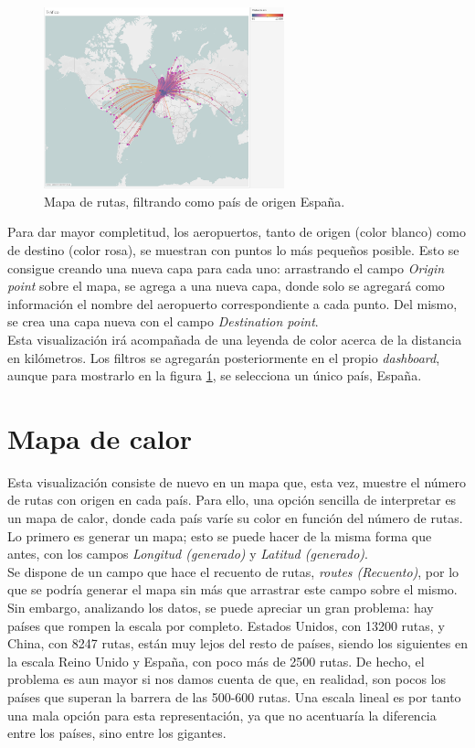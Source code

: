 \documentclass[11pt]{opticajnl}
\begin{document}
\begin{figure}[h]
\centering
\includegraphics[width=0.62\textwidth]{fotos/1.png}
\caption{Mapa de rutas, filtrando como país de origen España.}
\label{fig:1}
\end{figure}

Para dar mayor completitud, los aeropuertos, tanto de origen (color blanco) como de destino (color rosa), se muestran con puntos lo más pequeños posible. Esto se consigue creando una nueva capa para cada uno: arrastrando el campo \textit{Origin point} sobre el mapa, se agrega a una nueva capa, donde solo se agregará como información el nombre del aeropuerto correspondiente a cada punto. Del mismo, se crea una capa nueva con el campo \textit{Destination point}. \\

Esta visualización irá acompañada de una leyenda de color acerca de la distancia en kilómetros. Los filtros se agregarán posteriormente en el propio \textit{dashboard}, aunque para mostrarlo en la figura \ref{fig:1}, se selecciona un único país, España. 

\section{Mapa de calor}

Esta visualización consiste de nuevo en un mapa que, esta vez, muestre el número de rutas con origen en cada país. Para ello, una opción sencilla de interpretar es un mapa de calor, donde cada país varíe su color en función del número de rutas. Lo primero es generar un mapa; esto se puede hacer de la misma forma que antes, con los campos \textit{Longitud (generado)} y \textit{Latitud (generado)}. \\

Se dispone de un campo que hace el recuento de rutas, \textit{routes (Recuento)}, por lo que se podría generar el mapa sin más que arrastrar este campo sobre el mismo. Sin embargo, analizando los datos, se puede apreciar un gran problema: hay países que rompen la escala por completo. Estados Unidos, con 13200 rutas, y China, con 8247 rutas, están muy lejos del resto de países, siendo los siguientes en la escala Reino Unido y España, con poco más de 2500 rutas. De hecho, el problema es aun mayor si nos damos cuenta de que, en realidad, son pocos los países que superan la barrera de las 500-600 rutas. Una escala lineal es por tanto una mala opción para esta representación, ya que no acentuaría la diferencia entre los países, sino entre los gigantes. 
\end{document}
